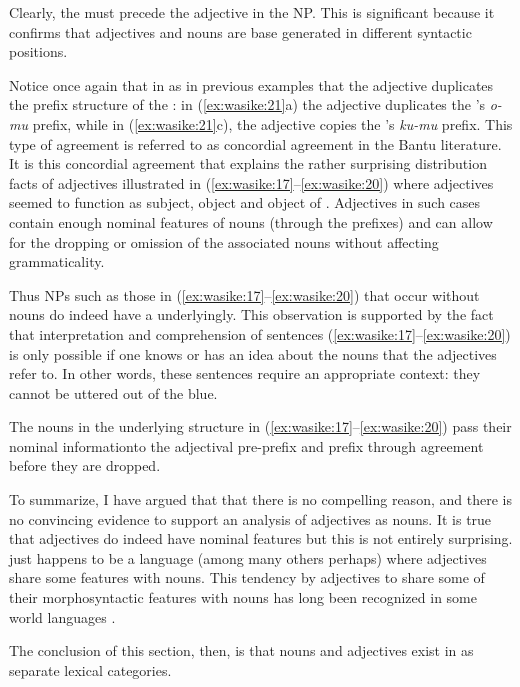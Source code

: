 \documentclass[output=paper,
modfonts
]{langscibook}
\begin{document}
Clearly, the  must precede the adjective in the NP. This is significant because it confirms that  adjectives and nouns are base generated in different syntactic positions. 

Notice once again that in  as in previous examples that the adjective duplicates the prefix structure of the : in (\ref{ex:wasike:21}a) the adjective duplicates the ’s \textit{o-mu} prefix, while in (\ref{ex:wasike:21}c), the adjective copies the ’s \textit{ku-mu} prefix. This type of agreement is referred to as concordial agreement in the Bantu literature. It is this concordial agreement that explains the rather surprising distribution facts of  adjectives illustrated in (\ref{ex:wasike:17}--\ref{ex:wasike:20}) where adjectives seemed to function as subject, object and object of . Adjectives in such cases contain enough nominal features of nouns (through the prefixes) and can allow for the dropping or omission of the associated nouns without affecting grammaticality.

Thus NPs such as those in (\ref{ex:wasike:17}--\ref{ex:wasike:20}) that occur without nouns do indeed have a  underlyingly. This observation is supported by the fact that interpretation and comprehension of sentences (\ref{ex:wasike:17}--\ref{ex:wasike:20}) is only possible if one knows or has an idea about the nouns that the adjectives refer to. In other words, these sentences require an appropriate context: they cannot be uttered out of the blue.

The nouns in the underlying structure in (\ref{ex:wasike:17}--\ref{ex:wasike:20}) pass their nominal informationto the adjectival pre-prefix and prefix  through agreement before they are dropped.

To summarize, I have argued that that there is no compelling reason, and there is no convincing evidence to support an analysis of  adjectives as nouns. It is true that  adjectives do indeed have nominal features but this is not entirely surprising.  just happens to be a language (among many others perhaps) where adjectives share some features with nouns. This tendency by adjectives to share some of their morphosyntactic features with nouns has long been recognized in some world languages \citep{Chafe2012}.

The conclusion of this section, then, is that nouns and adjectives exist in  as separate lexical categories. 
\end{document}
